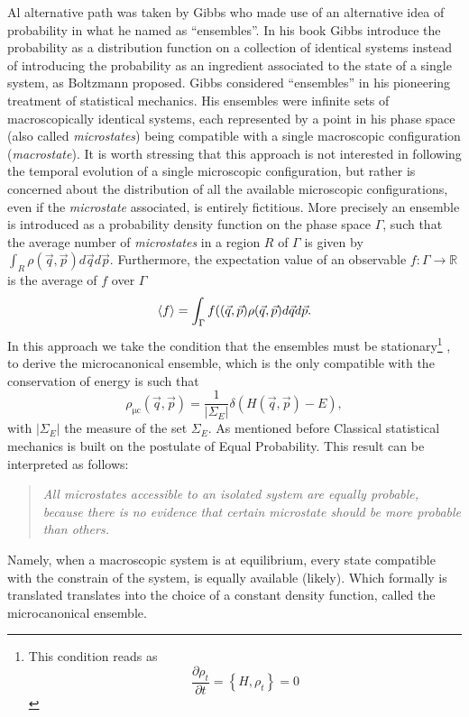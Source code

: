 Al alternative path was taken by Gibbs who made use of an alternative idea of probability in what he named as ``ensembles''. In his book \cite{gibbs_elementary_1902} Gibbs introduce the probability as a distribution function on a collection of identical systems instead of introducing the probability as an ingredient associated to the state of a single system, as Boltzmann proposed. Gibbs considered ``ensembles'' in his pioneering treatment of statistical mechanics. His ensembles were infinite sets of macroscopically identical systems, each represented  by a point in his phase space (also called \textit{microstates}) being compatible with a single macroscopic configuration (\textit{macrostate}). It is worth stressing that this approach is not interested in following the temporal evolution of a single microscopic configuration, but rather is concerned about the distribution of all the available microscopic configurations, even if the \textit{microstate} associated, is entirely fictitious.
\newline
More precisely an ensemble is introduced as a probability density function on the phase space $\Gamma$, such that the average number of \textit{microstates} in a region $R$ of $\Gamma$ is given by $\int_{R}\rho(\vec{q},\vec{p}) d\vec{q}d\vec{p}$. Furthermore, the expectation value of an observable $f:\Gamma\rightarrow\mathbb{R}$ is the average of $f$ over $\Gamma$
\begin{equation}
\mathinner{\langle{f}\rangle} = \int_{\Gamma} f((\vec{q},\vec{p})\rho(\vec{q},\vec{p})d\vec{q}d\vec{p}.
\label{CH1:Average_ensemble}
\end{equation}
In this approach we take the condition that the ensembles must be stationary\footnote{This condition reads as
\[\frac{\partial \rho_{t}}{\partial t}=\left\{H, \rho_{t}\right\} = 0\]} , to derive the microcanonical ensemble, which is the only compatible with the conservation of energy is such that
\begin{equation}
\rho_{\mathrm{\mu c}}(\vec{q},\vec{p})=\frac{1}{\left|\Sigma_{E}\right|} \delta(H(\vec{q},\vec{p})-E),
\label{CH1:Microcanonical_ensemble}
\end{equation}
with $|\Sigma_E|$ the measure of the set $\Sigma_E$.
\newline
As mentioned before Classical statistical mechanics is built on the postulate of Equal Probability.
This result can be interpreted as follows:

\begin{quote}
\textit{All microstates accessible to an isolated system are equally probable, because there is no evidence that certain microstate should be more probable than others.}
\end{quote}
Namely, when  a macroscopic system is at equilibrium, every state compatible with the constrain of the system, is equally available (likely). Which formally is translated translates into the choice of a constant density function, called the microcanonical ensemble.
